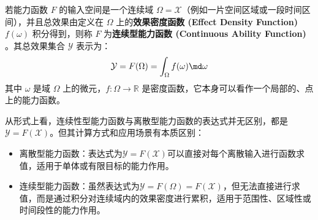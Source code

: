 \begin{definition}[连续型能力函数]
    若能力函数 $F$ 的输入空间是一个连续域 $\Omega = \mathcal{X}$（例如一片空间区域或一段时间区间），并且总效果由定义在 $\Omega$ 上的\textbf{效果密度函数 (Effect Density Function)} $f(\omega)$ 积分得到，则称 $F$ 为\textbf{连续型能力函数 (Continuous Ability Function)} 。其总效果集合 $\mathcal{Y}$ 表示为：
    \begin{equation}
        \mathcal{Y} = F(\Omega) = \int_{\Omega} f(\omega)  \md\omega
    \end{equation}
    其中 $\omega$ 是域 $\Omega$ 上的微元，$f: \Omega \to \mathbb{R}$ 是密度函数，它本身可以看作一个局部的、点上的能力函数。
\end{definition}

\begin{remark}
    从形式上看，连续性型能力函数与离散型能力函数的表达式并无区别，都是\(\mathcal{Y}=F(\mathcal{X})\)。但其计算方式和应用场景有本质区别：
    \begin{itemize}
        \item 离散型能力函数：表达式为\(\mathcal{Y}=F(\mathcal{X})\)可以直接对每个离散输入进行函数求值，适用于单体或有限目标的能力作用。
        \item 连续型能力函数：虽然表达式为\(\mathcal{Y}=F(\Omega)=F(\mathcal{X})\)，但无法直接进行求值，而是通过积分对连续域内的效果密度进行累积，适用于范围性、区域性或时间段性的能力作用。
    \end{itemize}
\end{remark}

